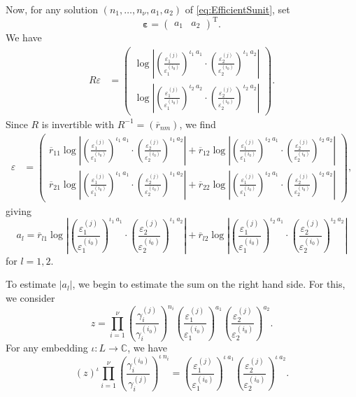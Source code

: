 \documentclass[11pt]{report}
\theoremstyle{definition}
\newcommand{\eps}{\varepsilon}
\begin{document}
Now, for any solution $(n_1, \dots, n_{\nu}, a_1, a_2)$ of \eqref{eq:EfficientSunit}, set
\[\mathbf{\eps} = \begin{pmatrix} a_1 & a_2 \end{pmatrix}^{\text{T}}.\]
We have
\begin{align*}
  R{\varepsilon}
  & = \begin{pmatrix}
    \log\left|\left(\frac{\varepsilon_1^{(j)}}{\varepsilon_1^{(i_0)}}\right)^{\iota_1 \ a_1} \cdot
      \left(\frac{\varepsilon_2^{(j)}}{\varepsilon_2^{(i_0)}}\right)^{\iota_1 \ a_2}\right| \\
    \log\left|\left(\frac{\varepsilon_1^{(j)}}{\varepsilon_1^{(i_0)}}\right)^{\iota_2\ a_2} \cdot
      \left(\frac{\varepsilon_2^{(j)}}{\varepsilon_2^{(i_0)}}\right)^{\iota_2 \ a_2}\right|
  \end{pmatrix}.
\end{align*}
Since $R$ is invertible with $R^{-1} = (\overline{r}_{nm})$, we find
\begin{align*}
  {\varepsilon}
  & = \begin{pmatrix} \overline{r}_{11}\log\left|\left(\frac{\varepsilon_1^{(j)}}{\varepsilon_1^{(i_0)}}\right)^{\iota_1 \ a_1} \cdot \left(\frac{\varepsilon_2^{(j)}}{\varepsilon_2^{(i_0)}}\right)^{\iota_1 \ a_2}\right| +\overline{r}_{12}\log\left|\left(\frac{\varepsilon_1^{(j)}}{\varepsilon_1^{(i_0)}}\right)^{\iota_2\ a_1}\cdot \left(\frac{\varepsilon_2^{(j)}}{\varepsilon_2^{(i_0)}}\right)^{\iota_2 \ a_2}\right| \\
\overline{r}_{21}\log\left|\left(\frac{\varepsilon_1^{(j)}}{\varepsilon_1^{(i_0)}}\right)^{\iota_1 \ a_1}\cdot \left(\frac{\varepsilon_2^{(j)}}{\varepsilon_2^{(i_0)}}\right)^{\iota_1 \ a_2}\right| + \overline{r}_{22}\log\left|\left(\frac{\varepsilon_1^{(j)}}{\varepsilon_1^{(i_0)}}\right)^{\iota_2\ a_1}\cdot \left(\frac{\varepsilon_2^{(j)}}{\varepsilon_2^{(i_0)}}\right)^{\iota_2 \ a_2}\right|
  \end{pmatrix},
\end{align*}
giving
\[a_l = \overline{r}_{l1}\log\left|\left(\frac{\varepsilon_1^{(j)}}{\varepsilon_1^{(i_0)}}\right)^{\iota_1 \ a_1}\cdot \left(\frac{\varepsilon_2^{(j)}}{\varepsilon_2^{(i_0)}}\right)^{\iota_1 \ a_2}\right| +
\overline{r}_{l2}\log\left|\left(\frac{\varepsilon_1^{(j)}}{\varepsilon_1^{(i_0)}}\right)^{\iota_2\ a_1}\cdot \left(\frac{\varepsilon_2^{(j)}}{\varepsilon_2^{(i_0)}}\right)^{\iota_2 \ a_2}\right|\]
for $l = 1,2$.

To estimate $|a_l|$, we begin to estimate the sum on the right hand side. For this, we consider
\[z = \prod_{i = 1}^{\nu} \left( \frac{\gamma_i^{(j)}}{\gamma_i^{(i_0)}}\right)^{n_i}\left( \frac{\varepsilon_1^{(j)}}{\varepsilon_1^{(i_0)}}\right)^{a_1}\left( \frac{\varepsilon_2^{(j)}}{\varepsilon_2^{(i_0)}}\right)^{a_2}.\]
For any embedding $\iota: L \to \mathbb{C}$, we have
\[(z)^{\iota} \prod_{i = 1}^{\nu} \left( \frac{\gamma_i^{(i_0)}}{\gamma_i^{(j)}}\right)^{\iota \ n_i} =  \left( \frac{\varepsilon_1^{(j)}}{\varepsilon_1^{(i_0)}}\right)^{\iota \ a_1}\left( \frac{\varepsilon_2^{(j)}}{\varepsilon_2^{(i_0)}}\right)^{\iota \ a_2}.\]
\end{document}
